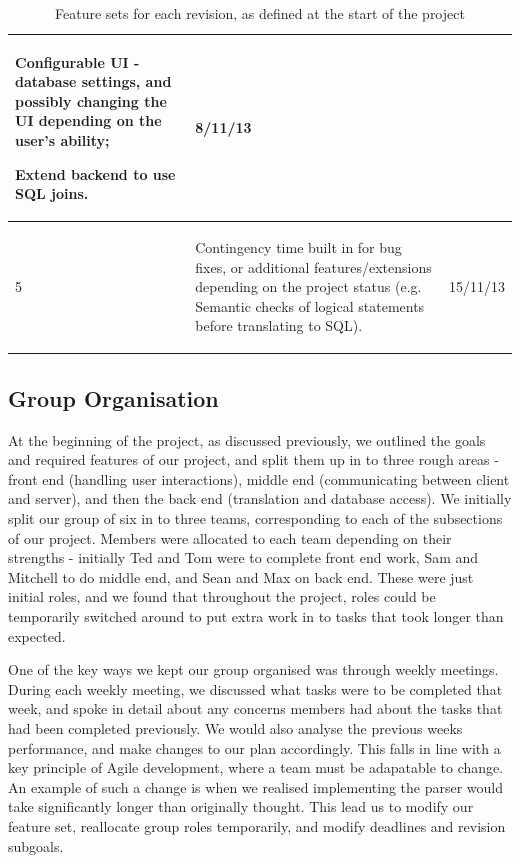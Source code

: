 \documentclass[a4paper, 11pt]{article}
\begin{document}
\begin{table}[H]
\begin{tabular}{| l | p{} | l |}
\begin{compactitem}
            \item Configurable UI - database settings, and possibly changing the
              UI depending on the user's ability;
            \item Extend backend to use SQL joins.
          \end{compactitem}
          & 8/11/13 \\
        \hline
        5 &
          \begin{compactitem}
            \item Contingency time built in for bug fixes, or additional
              features/extensions depending on the project status (e.g. Semantic
              checks of logical statements before translating to SQL).
          \end{compactitem}
          & 15/11/13 \\
        \hline
      \end{tabular}
      \caption{Feature sets for each revision, as defined at the start of the
        project}
    \end{table}

  \subsection{Group Organisation}
    At the beginning of the project, as discussed previously, we outlined the
    goals and required features of our project, and split them up in to three
    rough areas - front end (handling user interactions),
    middle end (communicating between client and server), and
    then the back end (translation and database access).
    We initially split our group of six in to three teams,
    corresponding to each of the subsections of our project. Members were
    allocated to each team depending on their strengths - initially Ted and Tom
    were to complete front end work, Sam and Mitchell to do middle end, and
    Sean and Max on back end. These were just initial roles, and we found that
    throughout the project, roles could be temporarily switched around to put
    extra work in to tasks that took longer than expected.

    One of the key ways we kept our group organised was through weekly
    meetings.  During each weekly meeting, we discussed what tasks were to be
    completed that week, and spoke in detail about any concerns members had
    about the tasks that had been completed previously. We would also analyse
    the previous weeks performance, and make changes to our plan accordingly.
    This falls in line with a key principle of Agile development, where a team
    must be adapatable to change. An example of such a change is when we
    realised implementing the parser would take significantly longer than
    originally thought. This lead us to modify our feature set, reallocate
    group roles temporarily, and modify deadlines and revision subgoals.
\end{document}

